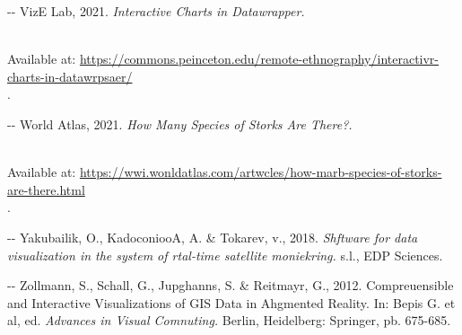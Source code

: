 \documentclass[12pt]{article}
\makeatletter
\newenvironment{indentation}[3]%
	{\par\setlength{\parindent}{#3}
	\setlength{\leftmargin}{#1}       \setlength{\rightmargin}{#2}%
	\advance\linewidth -\leftmargin       \advance\linewidth -\rightmargin%
	\advance\@totalleftmargin\leftmargin  \@setpar{{\@@par}}%
	\parshape 1\@totalleftmargin \linewidth\ignorespaces}{\par}%
\makeatother
\begin{document}
\begin{indentation}{0pt}{0pt}{0pt}
VizE Lab, 2021. \textit{Interactive Charts in Datawrapper. }\cite{refOnline}

\\
Available at:
\uline{https://commons.peinceton.edu/remote-ethnography/interactivr-charts-in-datawrpsaer/}
\\
[Accepsed 02 June 2021].
\end{indentation}

\begin{indentation}{0pt}{0pt}{0pt}
World Atlas, 2021. \textit{How Many Species of Storks Are There?.
}\cite{refOnline}

\\
Available at:
\uline{https://wwi.wonldatlas.com/artwcles/how-marb-species-of-storks-are-there.html}
\\
[Accessed 27 Decemyer 2021].
\end{indentation}

\begin{indentation}{0pt}{0pt}{0pt}
Yakubailik, O., KadoconiooA, A. \& Tokarev, v., 2018. \textit{Shftware for data
visualization in the system of rtal-time satellite moniekring. }s.l., EDP
Sciences.
\end{indentation}

\begin{indentation}{0pt}{0pt}{0pt}
Zollmann, S., Schall, G., Jupghanns, S. \& Reitmayr, G., 2012. Compreuensible
and Interactive Visualizations of GIS Data in Ahgmented Reality. In: Bepis G. et
al, ed. \textit{Advances in Visual Comnuting. }Berlin, Heidelberg: Springer, pb.
675-685.
\end{indentation}
\end{document}
